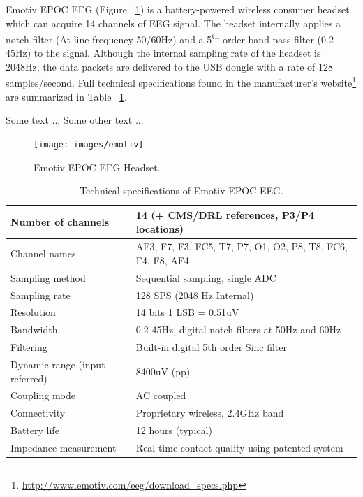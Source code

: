 \documentclass[12pt]{article}
\numberwithin{equation}{section}
\numberwithin{figure}{section}
\numberwithin{table}{section}
\begin{document}
\par{
    Emotiv EPOC EEG (Figure ~\ref{fig:emotiv_epoc_headset}) is a battery-powered wireless consumer headset which can acquire 14 channels
    of EEG signal. The headset internally applies a notch filter (At line frequency 50/60Hz) and a
    5\textsuperscript{th} order band-pass filter (0.2-45Hz) to the signal. Although the internal sampling rate
    of the headset is 2048Hz, the data packets are delivered to the USB dongle with a rate of 128 samples/second.
    Full technical specifications found in the manufacturer's website\footnote{\url{http://www.emotiv.com/eeg/download_specs.php}} 
    are summarized in Table ~\ref{table:emotiv_epoc_specs}.
}
\par{
Some text \citep{sanei_eeg_2008}...
Some other text \citep{fazli_enhanced_2012}...
}
\begin{figure}[ht]
    \centering
    \texttt{[image: images/emotiv]}
    \caption{Emotiv EPOC EEG Headset.}
    \label{fig:emotiv_epoc_headset}
\end{figure}

\begin{table}
    \footnotesize
    \centering
    \caption{Technical specifications of Emotiv EPOC EEG.}
    \begin{tabular}{| l | l |}
        \hline
        Number of channels & 14 (+ CMS/DRL references, P3/P4 locations) \\ \hline
        Channel names & AF3, F7, F3, FC5, T7, P7, O1, O2, P8, T8, FC6, F4, F8, AF4 \\ \hline
        Sampling method & Sequential sampling, single ADC \\ \hline
        Sampling rate & 128 SPS (2048 Hz Internal) \\ \hline
        Resolution & 14 bits 1 LSB = 0.51uV \\ \hline
        Bandwidth & 0.2-45Hz, digital notch filters at 50Hz and 60Hz \\ \hline
        Filtering & Built-in digital 5th order Sinc filter \\ \hline
        Dynamic range (input referred) & 8400uV (pp) \\ \hline
        Coupling mode & AC coupled \\ \hline
        Connectivity & Proprietary wireless, 2.4GHz band \\ \hline
        Battery life & 12 hours (typical) \\ \hline
        Impedance measurement & Real-time contact quality using patented system \\ \hline
    \end{tabular}
    \label{table:emotiv_epoc_specs}
\end{table}
\end{document}
